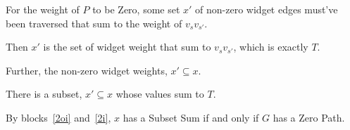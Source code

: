 \documentclass[11pt]{article}
\begin{document}
\begin{problems}
\begin{longFormProof}
\begin{block}[2i]
      \step For the weight of $P$ to be Zero, some set $x'$ of non-zero widget edges must've been traversed that sum to the weight of $v_sv_{s'}$.

      \step Then $x'$ is the set of widget weight that sum to $v_sv_{s'}$, which is exactly $T$.

      \step Further, the non-zero widget weights, $x' \subseteq x$.

      \step There is a subset, $x' \subseteq x$ whose values sum to $T$.

      \smallskip 
    \end{block} 
    \step By blocks~\ref{2oi} and~\ref{2i},
    $x$ has a Subset Sum
    if and only if $G$ has a Zero Path.
  \end{longFormProof}



  





  

\end{problems}
\end{document}
